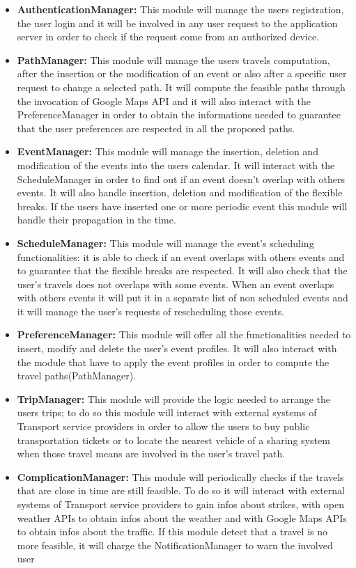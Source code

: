 \begin{itemize}
	\item \textbf{AuthenticationManager:} This module will manage the users registration, the user login and it will be involved in any user request to the application server in order to check if the request come from an authorized device.
	\item \textbf{PathManager:} This module will manage the users travels computation, after the insertion or the modification of an event or also after a specific user request to change a selected path. It will compute the feasible paths through the invocation of Google Maps API and it will also interact with the PreferenceManager in order to obtain the informations needed to guarantee that the user preferences are respected in all the proposed paths. 
	\item \textbf{EventManager:} This module will manage the insertion, deletion and modification of the events into the users calendar. It will interact with the ScheduleManager in order to find out if an event doesn't overlap with others events. It will also handle insertion, deletion and modification of the flexible breaks.
	If the users have inserted one or more periodic event this module will handle their propagation in the time. 
	\item \textbf{ScheduleManager:} This module will manage the event's scheduling functionalities: it is able to check if an event overlaps with others events and to guarantee that the flexible breaks are respected. It will also check that the user's travels does not overlaps with some events. When an event overlaps with others events it will put it in a separate list of non scheduled events and it will manage the user's requests of rescheduling those events.
	\item \textbf{PreferenceManager:} This module will offer all the functionalities needed to insert, modify and delete the user's event profiles. It will also interact with the module that have to apply the event profiles in order to compute the travel paths(PathManager).
	\item \textbf{TripManager:} This module will provide the logic needed to arrange the users trips; to do so this module will interact with external systems of Transport service providers in order to allow the users to buy public transportation tickets or to locate the nearest vehicle of a sharing system when those travel means are involved in the user's travel path.
	\item \textbf{ComplicationManager:} This module will periodically checks if the travels that are close in time are still feasible. To do so it will interact with external systems of Transport service providers to gain infos about strikes, with open weather APIs to obtain infos about the weather and with Google Maps APIs to obtain infos about the traffic. If this module detect that a travel is no more feasible, it will charge the NotificationManager to warn the involved user

\end{itemize}
